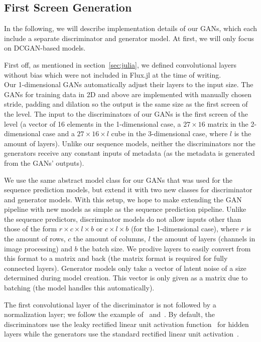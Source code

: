 \subsection{First Screen Generation}
\label{sec:first-screen-generation}


In the following, we will describe implementation details of our GANs,
which each include a separate discriminator and generator model.
At first, we will only focus on DCGAN-based models.

First off, as mentioned in section~\ref{sec:julia}, we defined
convolutional layers without bias which were not included in Flux.jl
at the time of writing. \\
Our 1-dimensional GANs automatically adjust their layers to the input
size. The GANs for training data in 2D and above are implemented with
manually chosen stride, padding and dilation so the output is the same
size as the first screen of the level. The input to the discriminators
of our GANs is the first screen of the level (a vector of 16 elements
in the 1-dimensional case, a $27 \times 16$ matrix in the
2-dimensional case and a $27 \times 16 \times l$ cube in the
3-dimensional case, where $l$ is the amount of layers). Unlike our
sequence models, neither the discriminators nor the generators receive
any constant inputs of metadata (as the metadata is generated from the
GANs' outputs).

We use the same abstract model class for our GANs that was used for
the sequence prediction models, but extend it with two new classes for
discriminator and generator models. With this setup, we hope to make
extending the GAN pipeline with new models as simple as the sequence
prediction pipeline. Unlike the sequence predictors, discriminator
models do not allow inputs other than those of the form
$r \times c \times l \times b$ or $c \times l \times b$ (for the
1-dimensional case), where $r$ is the amount of rows, $c$ the amount
of columns, $l$ the amount of layers (channels in image processing)
and $b$ the batch size. We prodive layers to easily convert from this
format to a matrix and back (the matrix format is required for fully
connected layers). Generator models only take a vector of latent noise
of a size determined during model creation. This vector is only given
as a matrix due to batching (the model handles this automatically).

The first convolutional layer of the discriminator is not followed by
a normalization layer; we follow the example
of~\cite{PytorchExamples2019}
and~\cite{martinarjovskyMartinarjovskyWassersteinGAN2019}. By default,
the discriminators use the leaky rectified linear unit activation
function~\cite{maasRectifierNonlinearitiesImprove,RectifierNeuralNetworks2019}
for hidden layers while the generators use the standard rectified
linear unit
activation~\cite{nairRectifiedLinearUnits,RectifierNeuralNetworks2019}.

